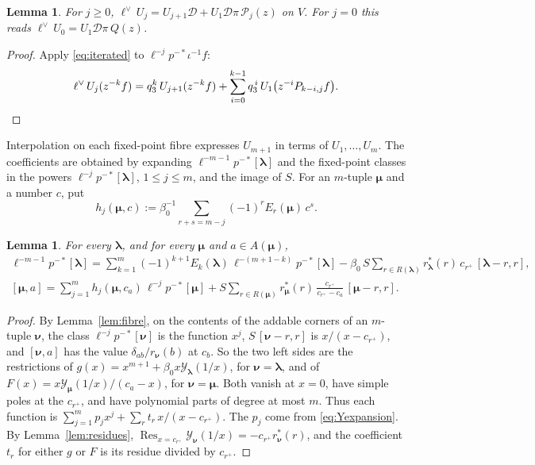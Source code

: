 \documentclass[11pt]{amsart}
\newtheorem{lemma}[theorem]{Lemma}
\theoremstyle{definition}
\theoremstyle{remark}
\newcommand{\betaz}{\beta_0}                     %
\newcommand{\bl}{{\boldsymbol{\lambda}}}         %
\newcommand{\bmu}{{\boldsymbol{\mu}}}
\newcommand{\Add}[1]{A(#1)}                      %
\newcommand{\Rem}[1]{R(#1)}                      %
\newcommand{\CY}{\mathcal Y}
\newcommand{\Yfn}[1]{\CY_{#1}}                   %
\newcommand{\res}[2]{r_{#1}(#2)}                 %
\newcommand{\cores}[2]{r^*_{#1}(#2)}             %
\newcommand{\Newton}[1]{E_{#1}}                  %
\newcommand{\ceig}[1]{c_{#1}}                    %
\newcommand{\bplus}[1]{{#1}^{+}}                 %
\newcommand{\fix}[1]{[#1]}                       %
\newcommand{\pt}[2]{[#1,#2]}                     %
\newcommand{\taut}{\ell}                         %
\newcommand{\dtaut}{\taut^{\vee}}                %
\newcommand{\pulm}{p^{-*}}                       %
\newcommand{\Shift}{S}                           %
\newcommand{\Hiso}{\iota}                        %
\newcommand{\DD}{\mathcal D}
\newcommand{\Pser}[1]{\mathcal P_{#1}}           %
\newcommand{\Qcr}{Q}                             %
\DeclareMathOperator{\Res}{Res}
\begin{document}
\begin{lemma}\label{lem:move}
For \(j\geq0\), \(\dtaut\,U_j=U_{j+1}\DD+U_1\DD\pi\,\Pser{j}(z)\) on \(V\). For \(j=0\) this reads
\(\dtaut\,U_0=U_1\DD\pi\,\Qcr(z)\).
\end{lemma}

\begin{proof}
Apply \eqref{eq:iterated} to \(\taut^{-j}\pulm\Hiso^{-1}f\):
\[
 \dtaut\,U_j(z^{-k}f)=q_3^k\,U_{j+1}(z^{-k}f)
 +\sum_{i=0}^{k-1}q_3^{\,i}\,U_1\bigl(z^{-i}P_{k-i,j}f\bigr).\qedhere
\]
\end{proof}

Interpolation on each fixed-point fibre expresses \(U_{m+1}\) in terms of
\(U_1,\dots,U_m\). The coefficients are obtained by expanding
\(\taut^{-m-1}\pulm\fix{\bl}\) and the fixed-point classes in the powers
\(\taut^{-j}\pulm\fix{\bl}\), \(1\leq j\leq m\), and the image of \(\Shift\).
For an \(m\)-tuple \(\bmu\) and a number \(c\), put
\[
 h_j(\bmu,c):=\betaz^{-1}\sum_{r+s=m-j}(-1)^r\Newton{r}(\bmu)\,c^s.
\]

\begin{lemma}\label{lem:expansion}
For every \(\bl\), and for every \(\bmu\) and \(a\in\Add{\bmu}\),
\begin{gather*}
 \taut^{-m-1}\pulm\fix{\bl}=\sum_{k=1}^m(-1)^{k+1}\Newton{k}(\bl)\,\taut^{-(m+1-k)}\pulm\fix{\bl}
 -\betaz\,\Shift\sum_{r\in\Rem{\bl}}\cores{\bl}{r}\,\ceig{\bplus{r}}\,\pt{\bl-r}{r},\\
 \pt{\bmu}{a}=\sum_{j=1}^mh_j(\bmu,\ceig{a})\,\taut^{-j}\pulm\fix{\bmu}
 +\Shift\sum_{r\in\Rem{\bmu}}\cores{\bmu}{r}\,\frac{\ceig{\bplus{r}}}{\ceig{\bplus{r}}-\ceig{a}}\,\pt{\bmu-r}{r}.
\end{gather*}
\end{lemma}

\begin{proof}
By Lemma~\ref{lem:fibre}, on the contents of the addable corners of an \(m\)-tuple \(\boldsymbol\nu\), the class
\(\taut^{-j}\pulm\fix{\boldsymbol\nu}\) is the function \(x^j\), \(\Shift\,\pt{\boldsymbol\nu-r}{r}\) is
\(x/(x-\ceig{\bplus{r}})\), and \(\pt{\boldsymbol\nu}{a}\) has the value \(\delta_{ab}/\res{\boldsymbol\nu}{b}\) at
\(\ceig{b}\). So the two left sides are the restrictions of \(g(x)=x^{m+1}+\betaz x\Yfn{\bl}(1/x)\), for
\(\boldsymbol\nu=\bl\), and of \(F(x)=x\Yfn{\bmu}(1/x)/(\ceig{a}-x)\), for \(\boldsymbol\nu=\bmu\). Both vanish at
\(x=0\), have simple poles at the \(\ceig{\bplus{r}}\), and have polynomial parts
of degree at most \(m\). Thus each function is
\(\sum_{j=1}^mp_jx^j+\sum_rt_r\,x/(x-\ceig{\bplus{r}})\). The \(p_j\) come from \eqref{eq:Yexpansion}. By
Lemma~\ref{lem:residues}, \(\Res_{x=\ceig{\bplus{r}}}\Yfn{\boldsymbol\nu}(1/x)=-\ceig{\bplus{r}}\cores{\boldsymbol\nu}{r}\),
and the coefficient \(t_r\) for either \(g\) or \(F\) is its residue divided by
\(\ceig{\bplus{r}}\).
\end{proof}
\end{document}
